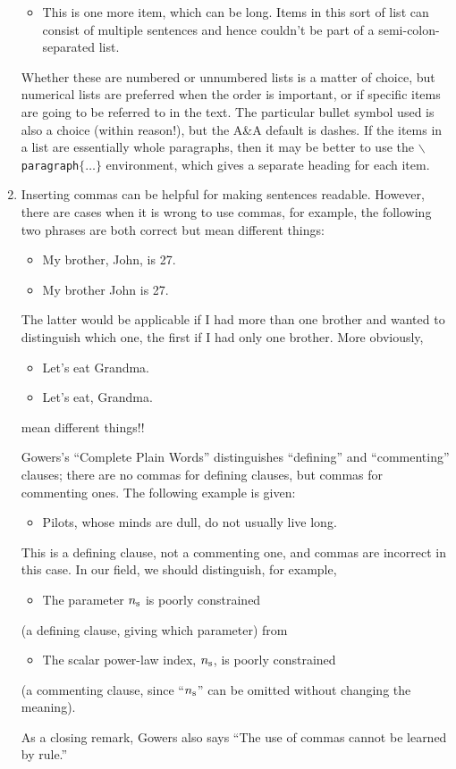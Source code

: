 \documentclass[letterpaper,11pt]{article}
\begin{document}
\begin{enumerate}
\begin{itemize}
\item{This is one more item, which can be long.  Items in this sort of
list can consist of multiple sentences and hence couldn't be part of a
semi-colon-separated list.}
\end{itemize}

\smallskip
\noindent
Whether these are numbered or unnumbered lists is a matter of choice, but numerical lists are preferred when the order is important, or if specific items are going to be referred to in the text.  The particular bullet symbol used is also a choice (within reason!), but the A\&A default is dashes.  If the items in a list are essentially whole paragraphs, then it may be better to use the {\tt $\backslash$paragraph$\{\dots\}$} environment, which gives a separate heading for each item.

\item
Inserting commas can be helpful for making sentences readable.
However, there are cases when it is wrong to use commas, for example, the
following two phrases are both correct but mean different things:
\begin{itemize}
\item My brother, John, is 27.
\item My brother John is 27.
\end{itemize}
The latter would be applicable if I had more than one brother and wanted to
distinguish which one, the first if I had only one brother.  More obviously,
\begin{itemize}
\item Let's eat Grandma.
\item Let's eat, Grandma.
\end{itemize}
mean different things!!

\smallskip
\noindent
Gowers's ``Complete Plain Words'' distinguishes ``defining'' and ``commenting''
clauses; there are no commas for defining clauses, but commas for commenting
ones.  The following example is given:
\begin{itemize}
\item Pilots, whose minds are dull, do not usually live long.
\end{itemize}
This is a defining clause, not a commenting one, and commas are incorrect
in this case.  In our field, we should distinguish, for example,
\begin{itemize}
\item The parameter $n_{\rm s}$ is poorly constrained
\end{itemize}
(a defining clause, giving which parameter) from
\begin{itemize}
\item The scalar power-law index, $n_{\rm s}$, is poorly constrained
\end{itemize}
(a commenting clause, since ``$n_{\rm s}$'' can be omitted without changing
the meaning).

\smallskip
\noindent
As a closing remark, Gowers also says ``The use of commas cannot be learned
by rule.''
\end{enumerate}
\end{document}
